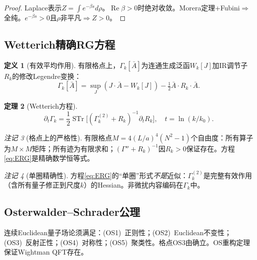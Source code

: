 \documentclass[12pt,a4paper]{article}
\theoremstyle{plain}
\newtheorem{theorem}{定理}[section]
\theoremstyle{definition}
\newtheorem{definition}[theorem]{定义}
\theoremstyle{remark}
\newtheorem{remark}[theorem]{注记}
\begin{document}
\begin{proof}
Laplace表示$Z=\int e^{-\beta s}d\rho$。$\operatorname{Re}\beta>0$时绝对收敛。Morera定理+Fubini$\Rightarrow$全纯。$e^{-\beta s}>0$且$\rho$非平凡$\Rightarrow Z>0$。
\end{proof}

\subsection{Wetterich精确RG方程}\label{sec:ERG}

\begin{definition}[有效平均作用]\label{def:Gamma}
有限格点上，$\Gamma_k[\bar{A}]$为连通生成泛函$W_k[J]$加IR调节子$R_k$的修改Legendre变换：
\begin{equation}\label{eq:Gammadef}
\Gamma_k[\bar{A}] = \sup_J(J\cdot\bar{A} - W_k[J]) - \tfrac{1}{2}\bar{A}\cdot R_k\cdot\bar{A}.
\end{equation}
\end{definition}

\begin{theorem}[Wetterich方程\cite{Wetterich1993}]\label{thm:ERG}
\begin{equation}\label{eq:ERG}
\partial_t\Gamma_k = \frac{1}{2}\operatorname{STr}\!\Big[(\Gamma_k^{(2)}+R_k)^{-1}\partial_tR_k\Big], \quad t=\ln(k/k_0).
\end{equation}
\end{theorem}

\begin{remark}[格点上的严格性]\label{rem:rigorous}
有限格点$M=4(L/a)^4(N^2-1)$个自由度：所有算子为$M\times M$矩阵；所有迹为有限求和；$(\Gamma''+R_k)^{-1}$因$R_k>0$保证存在。方程\eqref{eq:ERG}是精确数学恒等式。
\end{remark}

\begin{remark}[单圈精确性]\label{rem:oneloop}
方程\eqref{eq:ERG}的``单圈''形式\emph{不是}近似：$\Gamma_k^{(2)}$是完整有效作用（含所有量子修正到尺度$k$）的Hessian。非微扰内容编码在$\Gamma_k$中。
\end{remark}

\subsection{Osterwalder--Schrader公理}\label{sec:OSaxioms}

连续Euclidean量子场论须满足\cite{OsterwalderSchrader1973,OsterwalderSchrader1975}：(OS1)~正则性；(OS2)~Euclidean不变性；(OS3)~反射正性；(OS4)~对称性；(OS5)~聚类性。格点OS3由\cite{OsterwalderSeiler1978}确立。OS重构定理保证Wightman QFT存在。
\end{document}
